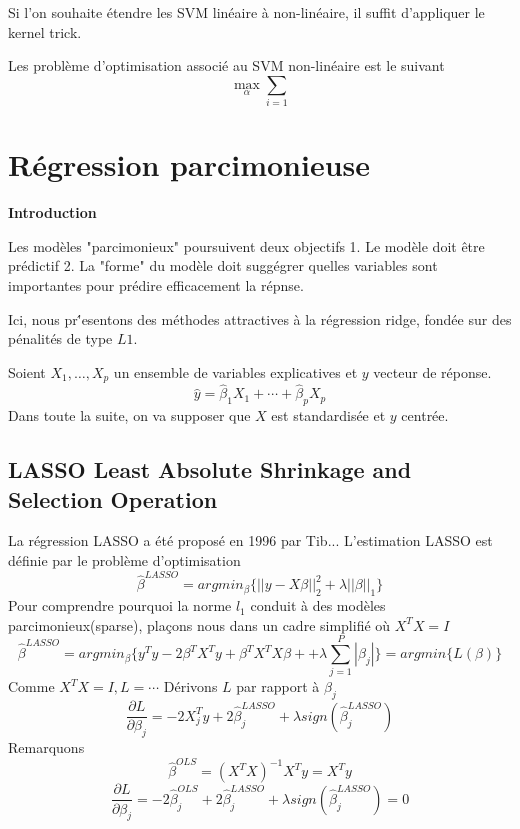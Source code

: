 \documentclass{article}
\begin{document}
Si l'on souhaite \'etendre les SVM lin\'eaire \`a non-lin\'eaire, il suffit d'appliquer le kernel trick.

Les probl\`eme d'optimisation associ\'e au SVM non-lin\'eaire est le suivant
\begin{equation}
\max_\alpha{\sum_{i=1}}
\end{equation}

\section{R\'egression parcimonieuse}
\textbf{Introduction}

Les mod\`eles "parcimonieux" poursuivent deux objectifs
1. Le mod\`ele doit \^etre pr\'edictif
2. La "forme" du mod\`ele doit sugg\'egrer quelles variables sont importantes pour pr\'edire efficacement  la r\'epnse.

Ici, nous pr\''esentons des m\'ethodes attractives \`a la r\'egression ridge, fond\'ee sur des p\'enalit\'es de type $L1$.

Soient $X_1,\ldots,X_p$ un ensemble de variables explicatives  et $y$ vecteur de r\'eponse.
\begin{equation}
\hat{y}=\hat{\beta}_1X_1+\cdots+\hat{\beta}_pX_p
\end{equation}
Dans toute la suite, on va supposer que $X$ est standardis\'ee et $y$ centr\'ee.

\subsection{LASSO Least Absolute Shrinkage and Selection Operation}
La r\'egression LASSO a \'et\'e propos\'e en 1996 par Tib... L'estimation LASSO est d\'efinie par le probl\`eme d'optimisation
\begin{equation}
\hat{\beta}^{LASSO}=argmin_\beta\{||y-X\beta||_2^2+\lambda ||\beta||_1\}
\end{equation} 
Pour comprendre pourquoi la norme $l_1$ conduit \`a des mod\`eles parcimonieux(sparse), pla\c{c}ons nous  dans un cadre simplifi\'e o\`u $X^TX=I$
\begin{equation}
\hat{\beta}^{LASSO}=argmin_\beta\{y^Ty-2\beta^TX^Ty+\beta^TX^TX\beta++\lambda\sum_{j=1}^P|\beta_j|\}=argmin\{L(\beta)\}
\end{equation}
Comme $X^TX=I, L=\cdots$
D\'erivons $L$ par rapport \`a $\beta_j$
\begin{equation}
\frac{\partial  L}{\partial \beta_j}=-2X_j^Ty+2\hat{\beta}_j^{LASSO}+\lambda sign(\hat{\beta}_j^{LASSO})
\end{equation} 
Remarquons
\begin{equation}
\hat{\beta}^{OLS}=(X^TX)^{-1}X^Ty=X^Ty
\end{equation}
\begin{equation}
\frac{\partial L}{\partial \beta_j}=-2\hat{\beta}_j^{OLS}+2\hat{\beta}_j^{LASSO}+\lambda sign(\hat{\beta}_j^{LASSO})=0
\end{equation}
\end{document}
